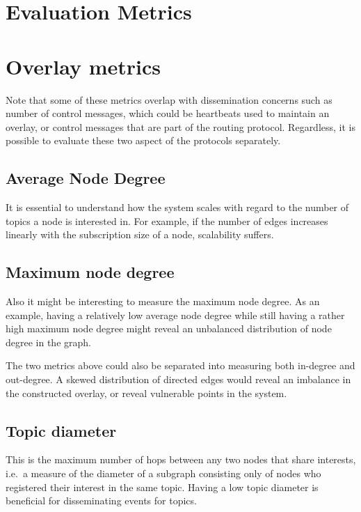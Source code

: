 \section{Evaluation Metrics}

\section{Overlay metrics}

Note that some of these metrics overlap with dissemination concerns
such as number of control messages, which could be heartbeats
used to maintain an overlay, or control messages that are part of
the routing protocol. Regardless, it is possible to evaluate these
two aspect of the protocols separately.

\subsection{Average Node Degree}

It is essential to understand how the system scales with regard
to the number of topics a node is interested in. For example, if the number of
edges increases linearly with the subscription size of a node,
scalability suffers.

\subsection{Maximum node degree}

Also it might be interesting to measure the maximum node
degree. As an example, having a relatively low average node
degree while still having a rather high maximum node degree
might reveal an unbalanced distribution of node degree in the
graph.

The two metrics above could also be separated into measuring both
in-degree and out-degree. A skewed distribution of directed edges
would reveal an imbalance in the constructed overlay, or reveal
vulnerable points in the system.


\subsection{Topic diameter}
This is the maximum number of hops between any two nodes that
share interests, i.e.\ a measure of the diameter of a subgraph
consisting only of nodes who registered their interest in the
same topic. Having a low topic diameter is beneficial for
disseminating events for topics.

